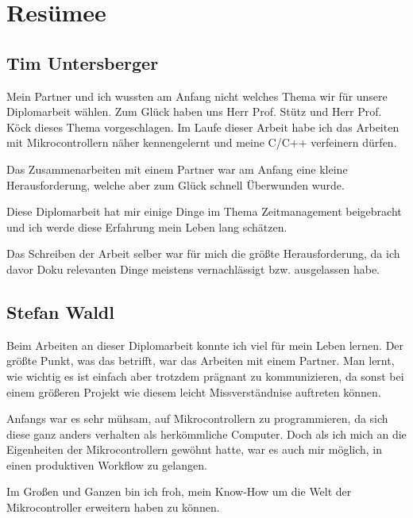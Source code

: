 \chapter{Resümee}

\section{Tim Untersberger}

Mein Partner und ich wussten am Anfang nicht welches Thema wir für unsere Diplomarbeit wählen. Zum Glück haben uns Herr Prof. Stütz und Herr Prof. Köck dieses Thema vorgeschlagen. Im Laufe dieser Arbeit habe ich das Arbeiten mit Mikrocontrollern näher kennengelernt und meine C/C++ verfeinern dürfen. 

Das Zusammenarbeiten mit einem Partner war am Anfang eine kleine Herausforderung, welche aber zum Glück schnell Überwunden wurde.

Diese Diplomarbeit hat mir einige Dinge im Thema Zeitmanagement beigebracht und ich werde diese Erfahrung mein Leben lang schätzen.

Das Schreiben der Arbeit selber war für mich die größte Herausforderung, da ich davor Doku relevanten Dinge meistens vernachlässigt bzw. ausgelassen habe.

\section{Stefan Waldl}
Beim Arbeiten an dieser Diplomarbeit konnte ich viel für mein Leben lernen. Der größte Punkt, was das betrifft, war das Arbeiten mit einem Partner. Man lernt, wie wichtig es ist einfach aber trotzdem prägnant zu kommunizieren, da sonst bei einem größeren Projekt wie diesem leicht Missverständnise auftreten können.

Anfangs war es sehr mühsam, auf Mikrocontrollern zu programmieren, da sich diese ganz anders verhalten als herkömmliche Computer. Doch als ich mich an die Eigenheiten der Mikrocontrollern gewöhnt hatte, war es auch mir möglich, in einen produktiven Workflow zu gelangen.

Im Großen und Ganzen bin ich froh, mein Know-How um die Welt der Mikrocontroller erweitern haben zu können.